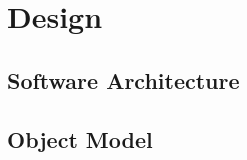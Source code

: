 \chapter{\hypre{} Design}
\label{hypre Design}

\section{Software Architecture}
\label{Software Architecture}

\section{Object Model}
\label{Object Model}
